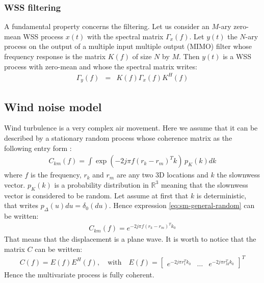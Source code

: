 \subsubsection{WSS filtering}
A fundamental property concerns the filtering. Let us consider an $M$-ary zero-mean WSS process $x(t)$ with the spectral matrix $\Gamma_x(f)$. Let $y(t)$ the $N$-ary process on the output of a multiple input multiple output (MIMO) filter whose frequency response is the matrix  $K(f)$ of size $N$ by $M$. Then $y(t)$ is a WSS process with zero-mean and whose the spectral matrix writes:
\begin{eqnarray}
 \label{eq:filteringMIMO}
 \Gamma_y(f)&=&K(f)\Gamma_x(f)K^H(f)
\end{eqnarray}
\subsection{Wind noise model}
Wind turbulence is a very complex air movement. Here we assume that it can be described by a stationary random  process whose coherence matrix as the following entry form \cite{nouvellet_itwb:2013}:
\begin{eqnarray}
\label{eq:sm-general-random}
C_{km}(f) = \int \exp(-2j\pi f (r_k-r_m)^T k ) \,p_K(k)dk
\end{eqnarray}
where $f$ is the frequency, $r_k$ and $r_m$ are any two 3D locations and $k$ the slownwess vector. $p_K(k)$ is a probability distribution in $\mathds{R}^{3}$ meaning that the slownwess vector is considered to be random.
Let assume at first that $k$ is deterministic, that writes $p_{\Delta}(u)du=\delta_{0}(du)$. Hence expression  \eqref{eq:sm-general-random} can be written:
\begin{eqnarray*}
C_{km}(f) = e^{-2j\pi f(r_k-r_m)^Tk_0}
\end{eqnarray*}
That means that the displacement is a plane wave. It is worth to notice that the matrix $C$ can be written:
\begin{eqnarray*}
C(f) = E(f)E^{H}(f), 
\quad\mathrm{with}\quad
E(f) = \begin{bmatrix}
e^{-2j\pi r_{1}^{T} k_0}&\ldots&e^{-2j\pi r_{M}^{T}k_0}
\end{bmatrix}^{T}
\end{eqnarray*}
Hence the multivariate process is fully coherent.

